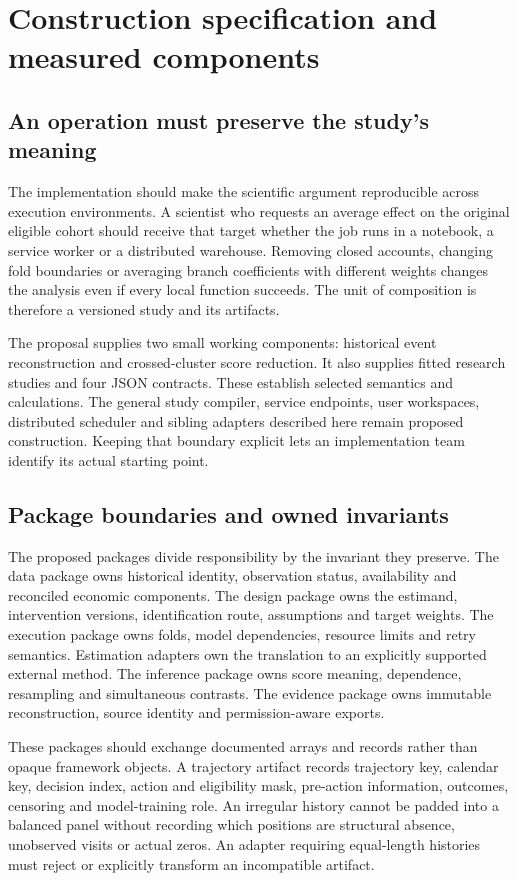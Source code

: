 \chapter{Construction specification and measured components}\label{ch:construction}
\section{An operation must preserve the study's meaning}
The implementation should make the scientific argument reproducible across
execution environments. A scientist who requests an average effect on the
original eligible cohort should receive that target whether the job runs in
a notebook, a service worker or a distributed warehouse. Removing closed
accounts, changing fold boundaries or averaging branch coefficients with
different weights changes the analysis even if every local function succeeds.
The unit of composition is therefore a versioned study and its artifacts.

The proposal supplies two small working components: historical event
reconstruction and crossed-cluster score reduction. It also supplies fitted
research studies and four JSON contracts. These establish selected semantics
and calculations. The general study compiler, service endpoints, user
workspaces, distributed scheduler and sibling adapters described here remain
proposed construction. Keeping that boundary explicit lets an implementation
team identify its actual starting point.

\section{Package boundaries and owned invariants}
The proposed packages divide responsibility by the invariant they preserve.
The data package owns historical identity, observation status, availability
and reconciled economic components. The design package owns the estimand,
intervention versions, identification route, assumptions and target weights.
The execution package owns folds, model dependencies, resource limits and
retry semantics. Estimation adapters own the translation to an explicitly
supported external method. The inference package owns score meaning,
dependence, resampling and simultaneous contrasts. The evidence package owns
immutable reconstruction, source identity and permission-aware exports.

These packages should exchange documented arrays and records rather than
opaque framework objects. A trajectory artifact records trajectory key,
calendar key, decision index, action and eligibility mask, pre-action
information, outcomes, censoring and model-training role. An irregular
history cannot be padded into a balanced panel without recording which
positions are structural absence, unobserved visits or actual zeros.
An adapter requiring equal-length histories must reject or explicitly
transform an incompatible artifact.

